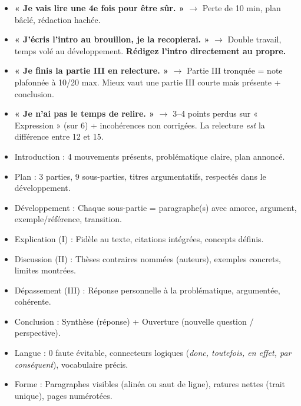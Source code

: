 \documentclass[11pt]{article}
\begin{document}
\begin{attention}
\begin{itemize}
\item \textbf{« Je vais lire une 4e fois pour être sûr. »} $\rightarrow$ Perte de 10 min, plan bâclé, rédaction hachée.
\item \textbf{« J'écris l'intro au brouillon, je la recopierai. »} $\rightarrow$ Double travail, temps volé au développement. \textbf{Rédigez l'intro directement au propre.}
\item \textbf{« Je finis la partie III en relecture. »} $\rightarrow$ Partie III tronquée = note plafonnée à 10/20 max. Mieux vaut une partie III courte mais présente + conclusion.
\item \textbf{« Je n'ai pas le temps de relire. »} $\rightarrow$ 3--4 points perdus sur « Expression » (sur 6) + incohérences non corrigées. La relecture \emph{est} la différence entre 12 et 15.
\end{itemize}
\end{attention}

\begin{aretenir}
\begin{itemize}
\item [ ] Introduction : 4 mouvements présents, problématique claire, plan annoncé.
\item [ ] Plan : 3 parties, 9 sous-parties, titres argumentatifs, respectés dans le développement.
\item [ ] Développement : Chaque sous-partie = paragraphe(s) avec amorce, argument, exemple/référence, transition.
\item [ ] Explication (I) : Fidèle au texte, citations intégrées, concepts définis.
\item [ ] Discussion (II) : Thèses contraires nommées (auteurs), exemples concrets, limites montrées.
\item [ ] Dépassement (III) : Réponse personnelle à la problématique, argumentée, cohérente.
\item [ ] Conclusion : Synthèse (réponse) + Ouverture (nouvelle question / perspective).
\item [ ] Langue : 0 faute évitable, connecteurs logiques (\emph{donc, toutefois, en effet, par conséquent}), vocabulaire précis.
\item [ ] Forme : Paragraphes visibles (alinéa ou saut de ligne), ratures nettes (trait unique), pages numérotées.
\end{itemize}
\end{aretenir}
\end{document}
